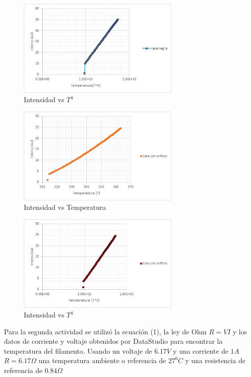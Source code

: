 \documentclass[12pt]{article}
\begin{document}
\begin{figure}[H]
\begin{center}
\includegraphics[width=0.7\textwidth]{negrat4.jpg}  
\caption{Intensidad vs $T^4$}
\label{2}
\end{center}
\end{figure}


\begin{figure}[H]
\begin{center}
\includegraphics[width=0.7\textwidth]{orificio.jpg}  
\caption{Intensidad vs Temperatura}
\label{uno}
\end{center}
\end{figure}


\begin{figure}[H]
\begin{center}
\includegraphics[width=0.7\textwidth]{orificiot4.jpg}  
\caption{Intensidad vs $T^4$}
\label{4}
\end{center}
\end{figure}
Para la segunda actividad se utilizó la ecuación (1), la ley de Ohm $R=VI$ y los datos de corriente y voltaje obtenidos por DataStudio para encontrar la temperatura del filamento.
Usando un voltaje de $6.17 V$ y una corriente de $1 A$
$R=6.17 \Omega$ una temperatura ambiente o referencia de $27 ^0C$ y una resistencia de referencia de $0.84\Omega$
\end{document}
